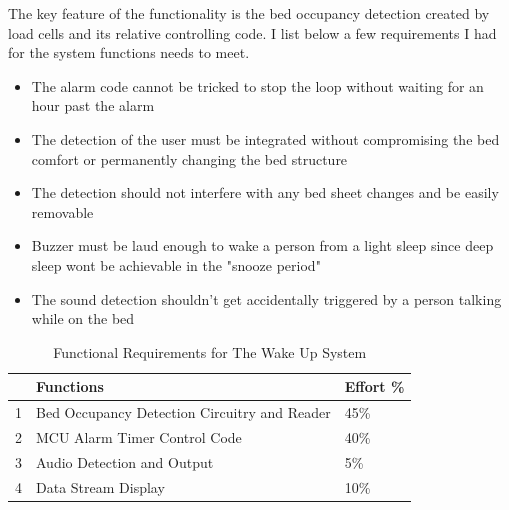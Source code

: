 \documentclass[11pt]{article}
\begin{document}
The key feature of the functionality is the bed occupancy detection created by load cells and its relative controlling code.
I list below a few requirements I had for the system functions needs to meet.
\begin{itemize}
	\item The alarm code cannot be tricked to stop the loop without waiting for an hour past the alarm
	\item The detection of the user must be integrated without compromising the bed comfort or permanently changing the bed structure 
	\item The detection should not interfere with any bed sheet changes and be easily removable
	\item Buzzer must be laud enough to wake a person from a light sleep since deep sleep wont be achievable in the "snooze period"
	\item The sound detection shouldn't get accidentally triggered by a person talking while on the bed
\end{itemize} 

\begin{table}[H]
	\centering
	\caption{Functional Requirements for The Wake Up System}
	\begin{tabular}{|l|l|l|}
		\hline
		&\textbf{Functions} &Effort \%\\
		\hline
		1&Bed Occupancy Detection Circuitry and Reader& 45\%\\
		2&MCU Alarm Timer Control Code& 40\%\\
		3&Audio Detection and Output &5\%\\
		4&Data Stream Display &10\%\\
		\hline
	\end{tabular}
	\label{tab:FR}
\end{table}
\end{document}
